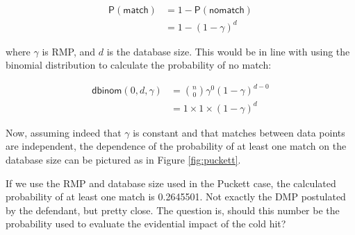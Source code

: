\documentclass[10pt,dvipsnames,enabledeprecatedfontcommands]{scrartcl}
\newcommand{\pr}[1]{\mathsf{P}(#1)}
\begin{document}
\begin{align*}
\pr{\mathsf{match}} & = 1 - \pr{\mathsf{no match}}\\
& = 1 - (1-\gamma)^d
\end{align*}

\noindent where \(\gamma\) is RMP, and \(d\) is the database size. This
would be in line with using the binomial distribution to calculate the
probability of no match:

\begin{align*}
\mathsf{dbinom}(0,d,\gamma) & = {n \choose 0} \gamma^0 (1-\gamma)^{d-0}\\
& = 1 \times 1 \times (1-\gamma)^d
\end{align*}

Now, assuming indeed that \(\gamma\) is constant and that matches
between data points are independent, the dependence of the probability
of at least one match on the database size can be pictured as in Figure
\ref{fig:puckett}.

If we use the RMP and database size used in the Puckett case, the
calculated probability of at least one match is 0.2645501. Not exactly
the DMP postulated by the defendant, but pretty close. The question is,
should this number be the probability used to evaluate the evidential
impact of the cold hit?
\end{document}
